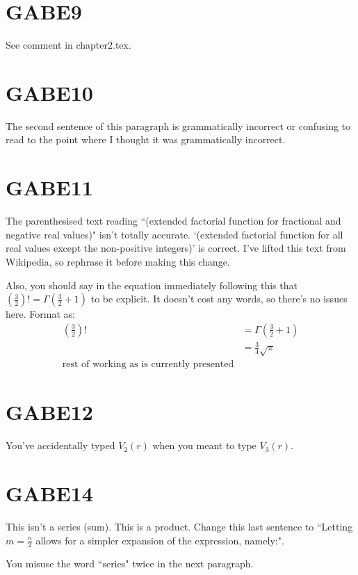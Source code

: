 \section{GABE9}
See comment in chapter\textunderscore2.tex.

\section{GABE10}
The second sentence of this paragraph is grammatically incorrect or confusing to read to the point where I thought it was grammatically incorrect.

\section{GABE11}
The parenthesised text reading ``(extended factorial function for fractional and negative real values)" isn't totally accurate. `(extended factorial function for all real values except the non-positive integers)' is correct. I've lifted this text from Wikipedia, so rephrase it before making this change.
\par Also, you should say in the  equation immediately following this that $\left(\frac{3}{2}\right)! = \Gamma\left(\frac{3}{2} + 1 \right)$ to be explicit. It doesn't cost any words, so there's no issues here. Format as:
\begin{align*}
    \left(\frac{3}{2}\right)! &= \Gamma \left(\frac{3}{2} + 1 \right) \\
    &= \frac{3}{4} \sqrt{\pi} \\
    \text{rest of working as is currently presented}
\end{align*}

\section{GABE12}
You've accidentally typed $V_{2}(r)$ when you meant to type $V_{3}(r)$.

\section{GABE14}
This isn't a series (sum). This is a product. Change this last sentence to ``Letting $m = \frac{n}{2}$ allows for a simpler expansion of the expression, namely:".
\par You misuse the word ``series" twice in the next paragraph.

